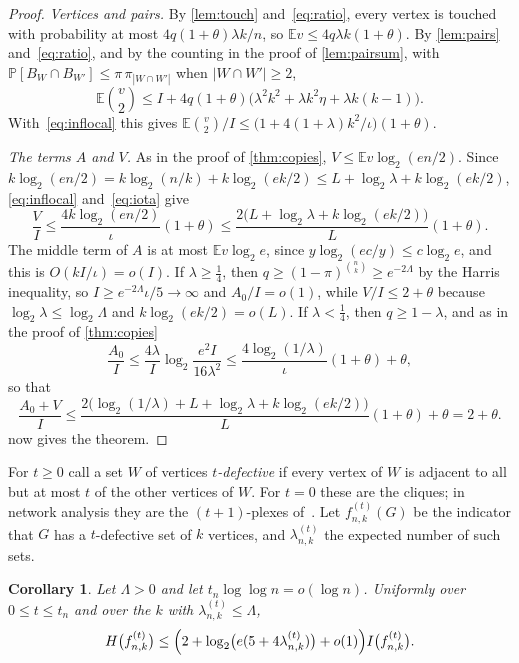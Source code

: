 \documentclass[11pt]{amsart}
\newtheorem{corollary}[theorem]{Corollary}
\theoremstyle{remark}
\newcommand{\E}{\mathbb{E}}
\renewcommand{\Pr}{\mathbb{P}}
\begin{document}
\begin{proof}
\emph{Vertices and pairs.} By \cref{lem:touch} and~\eqref{eq:ratio}, every vertex is touched with probability at
most $4q(1+\theta)\lambda k/n$, so $\E v\le4q\lambda k(1+\theta)$. By \cref{lem:pairs} and~\eqref{eq:ratio}, and by
the counting in the proof of \cref{lem:pairsum}, with $\Pr[B_W\cap B_{W'}]\le\pi\,\pi_{|W\cap W'|}$ when
$|W\cap W'|\ge2$,
\[
\E\binom v2\le I+4q(1+\theta)\bigl(\lambda^2k^2+\lambda k^2\eta+\lambda k(k-1)\bigr).
\]
With~\eqref{eq:inflocal} this gives $\E\binom v2/I\le\bigl(1+4(1+\lambda)k^2/\iota\bigr)(1+\theta)$.

\emph{The terms $A$ and $V$.} As in the proof of \cref{thm:copies}, $V\le\E v\log_2(en/2)$. Since
$k\log_2(en/2)=k\log_2(n/k)+k\log_2(ek/2)\le L+\log_2\lambda+k\log_2(ek/2)$, \eqref{eq:inflocal}
and~\eqref{eq:iota} give
\[
\frac VI\le\frac{4k\log_2(en/2)}\iota(1+\theta)\le\frac{2\bigl(L+\log_2\lambda+k\log_2(ek/2)\bigr)}L(1+\theta).
\]
The middle term of $A$ is at most $\E v\log_2e$, since $y\log_2(ec/y)\le c\log_2e$, and this is $O(kI/\iota)=o(I)$. If
$\lambda\ge\frac14$, then $q\ge(1-\pi)^{\binom nk}\ge e^{-2\Lambda}$ by the Harris inequality, so
$I\ge e^{-2\Lambda}\iota/5\to\infty$ and $A_0/I=o(1)$, while $V/I\le2+\theta$ because $\log_2\lambda\le\log_2\Lambda$
and $k\log_2(ek/2)=o(L)$. If $\lambda<\frac14$, then $q\ge1-\lambda$,
and as in the proof of \cref{thm:copies}
\[
\frac{A_0}I\le\frac{4\lambda}{I}\log_2\frac{e^2I}{16\lambda^2}\le\frac{4\log_2(1/\lambda)}{\iota}(1+\theta)+\theta ,
\]
so that
\[
\frac{A_0+V}I\le\frac{2\bigl(\log_2(1/\lambda)+L+\log_2\lambda+k\log_2(ek/2)\bigr)}L(1+\theta)+\theta=2+\theta .
\]
 now gives the theorem.
\end{proof}

For $t\ge0$ call a set $W$ of vertices \emph{$t$-defective} if every vertex of $W$ is adjacent to all but at most $t$
of the other vertices of $W$. For $t=0$ these are the cliques; in network analysis they are the $(t+1)$-plexes
of~\cite{SF78}. Let $f^{(t)}_{n,k}(G)$ be the indicator that $G$ has a $t$-defective set of $k$ vertices, and
$\lambda^{(t)}_{n,k}$ the expected number of such sets.

\begin{corollary}\label{cor:plex}
Let $\Lambda>0$ and let $t_n\log\log n=o(\log n)$. Uniformly over $0\le t\le t_n$ and over the $k$ with
$\lambda^{(t)}_{n,k}\le\Lambda$,
\[
H\bigl(f^{(t)}_{n,k}\bigr)\le\Bigl(2+\log_2\bigl(e(5+4\lambda^{(t)}_{n,k})\bigr)+o(1)\Bigr)I\bigl(f^{(t)}_{n,k}\bigr).
\]
\end{corollary}
\end{document}
